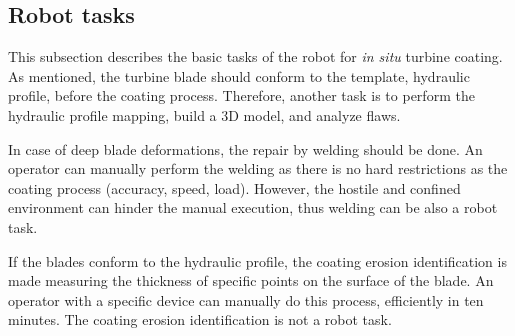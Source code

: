 \subsection{Robot tasks}\label{desc_taref}
This subsection describes the basic tasks of the robot for \textit{in situ}
turbine coating. %
As mentioned, the turbine blade should conform
to the template, hydraulic profile, before the coating process. Therefore,
another task is to perform the hydraulic profile mapping, build a 3D model, and
analyze flaws.

In case of deep blade deformations,%
the repair by welding should be done.%
An operator can manually perform the welding as there is no hard restrictions as the coating
process (accuracy, speed, load). However, the hostile and confined environment
can hinder the manual execution, thus welding can be also a robot task.

If the blades conform to the hydraulic profile, the coating erosion
identification is made measuring the thickness of specific points on the
surface of the blade. An operator with a specific device can manually do this
process, efficiently in ten minutes. The coating erosion identification is not a
robot task.

